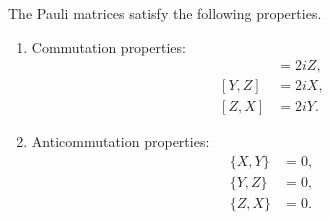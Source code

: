 \documentclass{article}
\begin{document}
  \begin{theorem}
    \label{thm:commutation-and-anti-commutation}
    The Pauli matrices satisfy the following properties. 
    \begin{enumerate}
      \item Commutation properties: 
        \begin{align} 
          [X, Y] & = 2iZ, \\
          [Y, Z] & = 2iX, \\
          [Z, X] & = 2iY.
        \end{align}

      \item Anticommutation properties: 
        \begin{align} 
          \{X, Y\} & = 0, \\
          \{Y, Z\} & = 0, \\
          \{Z, X\} & = 0.
        \end{align}
    \end{enumerate}
  \end{theorem}
\end{document}
